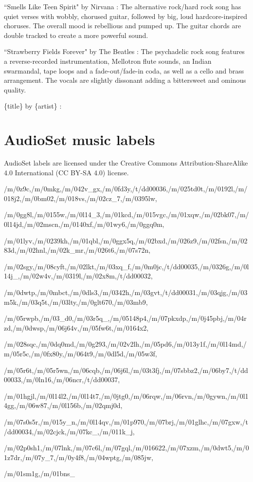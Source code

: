 \documentclass[nohyperref]{article}
\theoremstyle{plain}
\theoremstyle{definition}
\theoremstyle{remark}
\begin{document}
``Smells Like Teen Spirit" by Nirvana :
The alternative rock/hard rock song has quiet verses with wobbly, chorused guitar, followed by big, loud hardcore-inspired choruses. The overall mood is rebellious and pumped up. The guitar chords are double tracked to create a more powerful sound. 

``Strawberry Fields Forever" by The Beatles :
The psychadelic rock song features a reverse-recorded instrumentation, Mellotron flute sounds, an Indian swarmandal, tape loops and a fade-out/fade-in coda, as well as a cello and brass arrangement. The vocals are slightly dissonant adding a bittersweet and ominous quality. 

\{title\} by \{artist\} :

\section{AudioSet music labels}
\label{app:audioset-music-tags}

AudioSet labels are licensed under the Creative Commons Attribution-ShareAlike 4.0 International (CC BY-SA 4.0) license.


/m/0z9c,/m/0mkg,/m/042v\_gx,/m/0fd3y,/t/dd00036,/m/025td0t,/m/0192l,/m/018j2,/m/0bm02,/m/018vs,/m/02cz\_7,/m/0395lw,

/m/0gg8l,/m/0155w,/m/0l14\_3,/m/01kcd,/m/015vgc,/m/01xqw,/m/02bk07,/m/0l14jd,/m/02mscn,/m/0140xf,/m/01wy6,/m/0ggq0m,

/m/01lyv,/m/0239kh,/m/01qbl,/m/0ggx5q,/m/02bxd,/m/026z9,/m/02fsn,/m/0283d,/m/02hnl,/m/02k\_mr,/m/026t6,/m/07s72n,

/m/02sgy,/m/08cyft,/m/02lkt,/m/03xq\_f,/m/0m0jc,/t/dd00035,/m/0326g,/m/0l14j\_,/m/02w4v,/m/0319l,/m/02x8m,/t/dd00032,

/m/0dwtp,/m/0mbct,/m/0dls3,/m/0342h,/m/03gvt,/t/dd00031,/m/03qjg,/m/03m5k,/m/03q5t,/m/03lty,/m/0glt670,/m/03mb9,

/m/05rwpb,/m/03\_d0,/m/03r5q\_,/m/05148p4,/m/07pkxdp,/m/0j45pbj,/m/04rzd,/m/0dwsp,/m/06j64v,/m/05fw6t,/m/0164x2,

/m/028sqc,/m/0dq0md,/m/0g293,/m/02v2lh,/m/05pd6,/m/013y1f,/m/0l14md,/m/05r5c,/m/0fx80y,/m/064t9,/m/0dl5d,/m/05w3f,

/m/05r6t,/m/05r5wn,/m/06cqb,/m/06j6l,/m/03t3fj,/m/07sbbz2,/m/06by7,/t/dd00033,/m/0ln16,/m/06ncr,/t/dd00037,

/m/01hgjl,/m/0l14l2,/m/0l14t7,/m/0jtg0,/m/06rqw,/m/06rvn,/m/0gywn,/m/0l14gg,/m/06w87,/m/0l156b,/m/02qmj0d,

/m/07s0s5r,/m/015y\_n,/m/0l14qv,/m/01p970,/m/07brj,/m/01glhc,/m/07gxw,/t/dd00034,/m/02cjck,/m/07kc\_,/m/011k\_j,

/m/02p0sh1,/m/07lnk,/m/07c6l,/m/07gql,/m/016622,/m/07xzm,/m/0dwt5,/m/01z7dr,/m/07y\_7,/m/0y4f8,/m/04wptg,/m/085jw,

/m/01sm1g,/m/01bns\_
\end{document}
